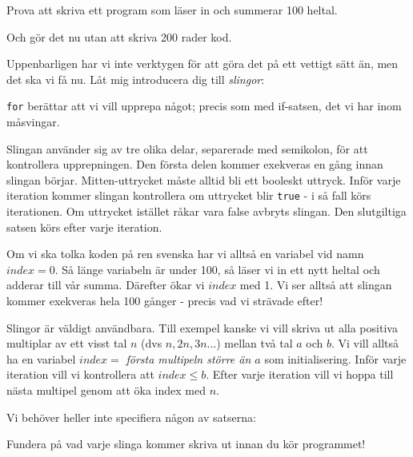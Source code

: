 Prova att skriva ett program som läser in och summerar 100 heltal.

Och gör det nu utan att skriva 200 rader kod.

Uppenbarligen har vi inte verktygen för att göra det på ett vettigt sätt än, men det ska vi få nu. Låt mig introducera dig till \emph{slingor}:



\texttt{for} berättar att vi vill upprepa något; precis som med if-satsen, det vi har inom måsvingar. 

Slingan använder sig av tre olika delar, separerade med semikolon, för att kontrollera upprepningen. Den första delen kommer exekveras en gång innan slingan börjar. Mitten-uttrycket måste alltid bli ett booleskt uttryck. Inför varje iteration kommer slingan kontrollera om uttrycket blir \texttt{true} - i så fall körs iterationen. Om uttrycket istället råkar vara false avbryts slingan. Den slutgiltiga satsen körs efter varje iteration.

Om vi ska tolka koden på ren svenska har vi alltså en variabel vid namn $index = 0$. Så länge variabeln är under 100, så läser vi in ett nytt heltal och adderar till vår summa. Därefter ökar vi $index$ med 1. Vi ser alltså att slingan kommer exekveras hela 100 gånger - precis vad vi strävade efter!

Slingor är väldigt användbara. Till exempel kanske vi vill skriva ut alla positiva multiplar av ett visst tal $n$ (dvs $n, 2n, 3n...$) mellan två tal $a$ och $b$. Vi vill alltså ha en variabel $index = $ \emph{första multipeln större än $a$} som initialisering. Inför varje iteration vill vi kontrollera att $index \le b$. Efter varje iteration vill vi hoppa till nästa multipel genom att öka index med $n$.



Vi behöver heller inte specifiera någon av satserna:



Fundera på vad varje slinga kommer skriva ut innan du kör programmet!
